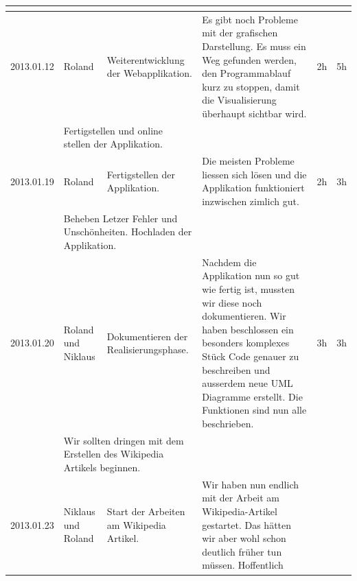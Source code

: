 \documentclass[11pt,paper=a4,final]{scrartcl}
\begin{document}
\begin{landscape}
\begin{longtable}{|p{1.8cm}|p{1.5cm}|p{5.0cm}|p{11.0cm}|l|l|}
{    }  & \multicolumn{2}{l|}{} \\ \hline
    \hline
    2013.01.12 & Roland &
    Weiterentwicklung der Webapplikation. &
    Es gibt noch Probleme mit der grafischen Darstellung. Es muss ein Weg
    gefunden werden, den Programmablauf kurz zu stoppen, damit die
    Visualisierung \"uberhaupt sichtbar wird. &
    2h & 5h \\ \hline \nopagebreak
    \multicolumn{2}{|l|}{\bf Pendenzen} &\multicolumn{2}{p{16.0cm}|}{
    Fertigstellen und online stellen der Applikation.
    }  & \multicolumn{2}{l|}{} \\ \hline
    \hline
    2013.01.19 & Roland &
    Fertigstellen der Applikation. &
    Die meisten Probleme liessen sich l\"osen und die Applikation funktioniert
    inzwischen zimlich gut.&
    2h & 3h \\ \hline \nopagebreak
    \multicolumn{2}{|l|}{\bf Pendenzen} &\multicolumn{2}{p{16.0cm}|}{
    Beheben Letzer Fehler und Unsch\"onheiten. Hochladen der Applikation.
    }  & \multicolumn{2}{l|}{} \\ \hline
    \hline
    2013.01.20 & Roland und Niklaus&
    Dokumentieren der Realisierungsphase. &
    Nachdem die Applikation nun so gut wie fertig ist, mussten wir diese noch
    dokumentieren. Wir haben beschlossen ein besonders komplexes St\"uck Code
    genauer zu beschreiben und ausserdem neue UML Diagramme erstellt. Die
    Funktionen sind nun alle beschrieben.&
    3h & 3h \\ \hline \nopagebreak
    \multicolumn{2}{|l|}{\bf Pendenzen} &\multicolumn{2}{p{16.0cm}|}{
    Wir sollten dringen mit dem Erstellen des Wikipedia Artikels beginnen.
    }  & \multicolumn{2}{l|}{} \\ \hline
    \hline
    2013.01.23 & Niklaus und Roland &
    Start der Arbeiten am Wikipedia Artikel.    &
    Wir haben nun endlich mit der Arbeit am Wikipedia-Artikel gestartet. Das
    h\"atten wir aber wohl schon deutlich fr\"uher tun m\"ussen. Hoffentlich

\end{longtable}
\end{landscape}
\end{document}
